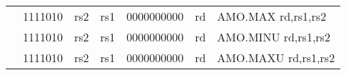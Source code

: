 \begin{table}[p]
\begin{small}
\begin{center}
\begin{tabular}{rcccccccccccl}
&
\multicolumn{2}{|c|}{1111010} &
\multicolumn{1}{c|}{rs2} &
\multicolumn{1}{c|}{rs1} &
\multicolumn{6}{c|}{0000000000} &
\multicolumn{1}{c|}{rd} & AMO.MAX rd,rs1,rs2 \\
\cline{2-12}
  

&
\multicolumn{2}{|c|}{1111010} &
\multicolumn{1}{c|}{rs2} &
\multicolumn{1}{c|}{rs1} &
\multicolumn{6}{c|}{0000000000} &
\multicolumn{1}{c|}{rd} & AMO.MINU rd,rs1,rs2 \\
\cline{2-12}
  

&
\multicolumn{2}{|c|}{1111010} &
\multicolumn{1}{c|}{rs2} &
\multicolumn{1}{c|}{rs1} &
\multicolumn{6}{c|}{0000000000} &
\multicolumn{1}{c|}{rd} & AMO.MAXU rd,rs1,rs2 \\
\cline{2-12}
  

\end{tabular}
\end{center}
\end{small}

\label{instr-table}
\end{table}
  

\newpage

